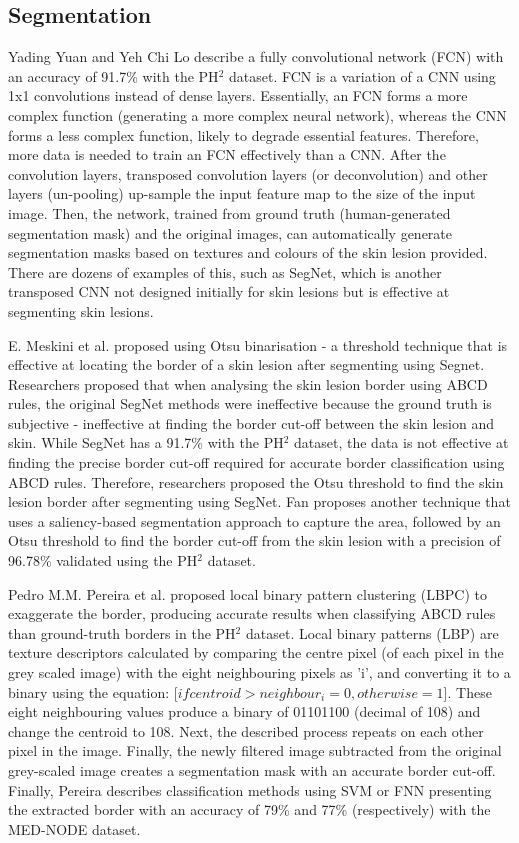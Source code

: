 \subsection{Segmentation}
Yading Yuan and Yeh Chi Lo describe a fully convolutional network (FCN) with an accuracy of 91.7\% with the PH$^2$ dataset\cite{Yuan2017a}. FCN is a variation of a CNN using 1x1 convolutions instead of dense layers. Essentially, an FCN forms a more complex function (generating a more complex neural network), whereas the CNN forms a less complex function, likely to degrade essential features. Therefore, more data is needed to train an FCN effectively than a CNN. After the convolution layers, transposed convolution layers (or deconvolution) and other layers (un-pooling) up-sample the input feature map to the size of the input image. Then, the network, trained from ground truth (human-generated segmentation mask) and the original images, can automatically generate segmentation masks based on textures and colours of the skin lesion provided. There are dozens of examples of this, such as SegNet\cite{Badrinarayanan2017}, which is another transposed CNN not designed initially for skin lesions but is effective at segmenting skin lesions.

E. Meskini et al. proposed using Otsu binarisation - a threshold technique that is effective at locating the border of a skin lesion after segmenting using Segnet\cite{Meskini2018}. Researchers proposed that when analysing the skin lesion border using ABCD rules, the original SegNet methods were ineffective because the ground truth is subjective - ineffective at finding the border cut-off between the skin lesion and skin. While SegNet has a 91.7\% with the PH$^2$ dataset, the data is not effective at finding the precise border cut-off required for accurate border classification using ABCD rules. Therefore, researchers proposed the Otsu threshold to find the skin lesion border after segmenting using SegNet. Fan proposes another technique that uses a saliency-based segmentation approach to capture the area, followed by an Otsu threshold\cite{Fan2017} to find the border cut-off from the skin lesion with a precision of 96.78\% validated using the PH$^2$ dataset.

Pedro M.M. Pereira et al. proposed local binary pattern clustering (LBPC) to exaggerate the border, producing accurate results when classifying ABCD rules than ground-truth borders in the PH$^2$ dataset\cite{Pereira2020}. Local binary patterns (LBP) are texture descriptors calculated by comparing the centre pixel (of each pixel in the grey scaled image) with the eight neighbouring pixels as 'i', and converting it to a binary using the equation:  [$if centroid > neighbour_i =  0, otherwise = 1$]. These eight neighbouring values produce a binary of 01101100 (decimal of 108) and change the centroid to 108. Next, the described process repeats on each other pixel in the image. Finally, the newly filtered image subtracted from the original grey-scaled image creates a segmentation mask with an accurate border cut-off. Finally, Pereira describes classification methods using SVM or FNN presenting the extracted border with an accuracy of 79\% and 77\% (respectively) with the MED-NODE dataset.

